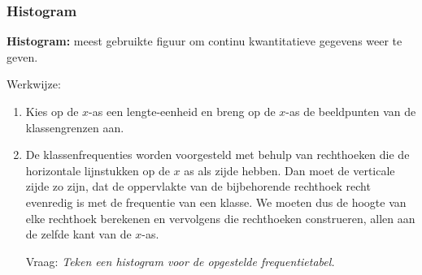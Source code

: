 \documentclass[dutch]{beamer}
\newcommand{\vraag}[1]{\begin{itemize}\item[Vraag:] {\it #1}\end{itemize}}
\begin{document}
\begin{frame}
\frametitle{Histogram}

{\bf Histogram:} meest gebruikte figuur om continu kwantitatieve gegevens weer te geven.

Werkwijze:
\begin{enumerate}
  \item Kies op de $x$-as een lengte-eenheid en breng op de $x$-as de beeldpunten van de klassengrenzen aan.
  \item De klassenfrequenties worden voorgesteld met behulp van rechthoeken die de horizontale lijnstukken op de $x$ as als zijde hebben. Dan moet de verticale zijde zo zijn, dat de oppervlakte van de bijbehorende rechthoek recht evenredig is met de frequentie van een klasse. We moeten dus de hoogte van elke rechthoek berekenen en vervolgens die rechthoeken construeren, allen aan de zelfde kant van de $x$-as.
\end{enumerate}

\vraag{Teken een histogram voor de opgestelde frequentietabel.}
\end{frame}
\end{document}
